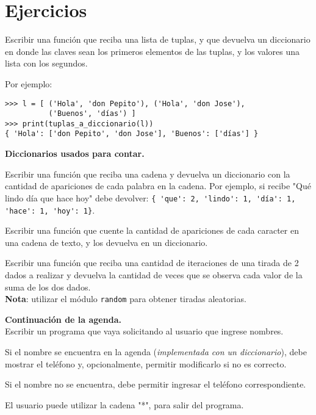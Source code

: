 \newpage
\section{Ejercicios}

\begin{ejercicio}
Escribir una función que reciba una lista de tuplas, y que devuelva
un diccionario en donde las claves sean los primeros elementos de las
tuplas, y los valores una lista con los segundos.

Por ejemplo:
\begin{lstlisting}[numbers=none]
>>> l = [ ('Hola', 'don Pepito'), ('Hola', 'don Jose'),
          ('Buenos', 'días') ]
>>> print(tuplas_a_diccionario(l))
{ 'Hola': ['don Pepito', 'don Jose'], 'Buenos': ['días'] }
\end{lstlisting}
\end{ejercicio}

\begin{ejercicio}
{\bf Diccionarios usados para contar.}
\begin{partes}
  \item Escribir una función que reciba una cadena y devuelva un diccionario con
la cantidad de apariciones de cada palabra en la cadena.  Por ejemplo, si
recibe "Qué lindo día que hace hoy" debe devolver:
\lstinline!{ 'que': 2, 'lindo': 1, 'día': 1, 'hace': 1, 'hoy': 1}!.

  \item Escribir una función que cuente la cantidad de apariciones de cada
caracter en una cadena de texto, y los devuelva en un diccionario.

  \item Escribir una función que reciba una cantidad de iteraciones de una tirada
de 2 dados a realizar y devuelva la cantidad de veces que se observa cada valor
de la suma de los dos dados. \\
{\bf Nota}: utilizar el módulo \verb!random! para obtener tiradas aleatorias.
\end{partes}
\end{ejercicio}

\begin{ejercicio}
{\bf Continuación de la agenda.} \\
Escribir un programa que vaya solicitando al usuario que ingrese nombres.
\begin{partes}
  \item Si el nombre se encuentra en la agenda (\emph{implementada con un
diccionario}), debe mostrar el teléfono y, opcionalmente, permitir
modificarlo si no es correcto.
  \item Si el nombre no se encuentra, debe permitir ingresar el teléfono
correspondiente.
\end{partes}
El usuario puede utilizar la cadena "*", para salir del programa.
\end{ejercicio}

